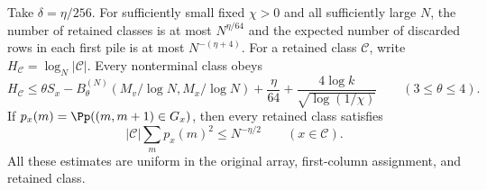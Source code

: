 \begin{lemma}\label{lem:upper-classes}
Take $\delta=\eta/256$. For sufficiently small fixed $\chi>0$ and
all sufficiently large $N$, the number of retained classes is at most
$N^{\eta/64}$ and the expected number of discarded rows in each
first pile is at most $N^{-(\eta+4)}$.
For a retained class $\mathcal C$, write
$H_{\mathcal C}=\log_N|\mathcal C|$. Every nonterminal class obeys
\begin{equation}\label{eq:upper-class-entropy}
 H_{\mathcal C}\le\theta S_x-B^{(N)}_\theta(M_v/\log N,M_x/\log N)
       +\frac{\eta}{64}
       +\frac{4\log k}{\sqrt{\log(1/\chi)}}
       \qquad(3\le\theta\le4).
\end{equation}
If $p_x(m)=\Pp((m,m+1)\in G_x)$, then every retained class satisfies
\begin{equation}\label{eq:upper-class-density}
 |\mathcal C|\sum_m p_x(m)^2\le N^{-\eta/2}
                  \qquad(x\in\mathcal C).
\end{equation}
All these estimates are uniform in the original array, first-column
assignment, and retained class.
\end{lemma}
